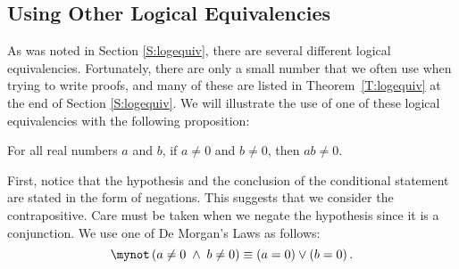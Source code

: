 \subsection*{Using Other Logical Equivalencies}
As was noted in Section \ref{S:logequiv}, there are several different logical equivalencies.  Fortunately, there are only a small number that we often use when trying to write proofs, and many of these are listed in Theorem~\ref{T:logequiv}  at the end of Section \ref{S:logequiv}.  We will illustrate the use of one of these logical equivalencies with the following proposition:
\begin{list}{}
  \item For all real numbers $a$ and $b$, if  $a \ne 0$  and  $b \ne 0$, then  $ab \ne 0$.
\end{list}
\vskip6pt
\noindent
First, notice that the hypothesis and the conclusion of the conditional statement are stated in the form of negations.  This suggests that we consider the contrapositive.  Care must be taken when we negate the hypothesis since it is a conjunction.  We use one of De Morgan's Laws as follows:
\[
\mynot  \left( {a \ne 0\; \wedge \;b \ne 0} \right) \equiv \left( {a = 0} \right) \vee \left( {b = 0} \right).
\]
\hbreak

